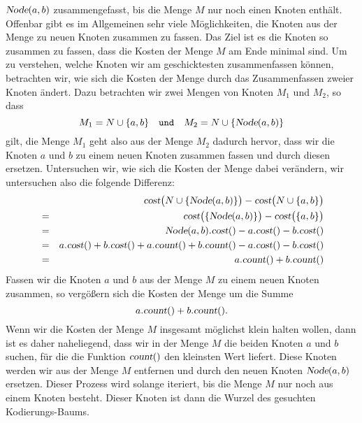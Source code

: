 $\textsl{Node}(a,b)$ zusammengefasst, bis die Menge $M$ nur noch einen Knoten enth\"alt.
Offenbar gibt es im Allgemeinen sehr viele M\"oglichkeiten, die Knoten aus der Menge zu
neuen Knoten zusammen zu fassen.  Das Ziel ist es die Knoten so zusammen zu fassen, dass
die Kosten der Menge $M$ am Ende  minimal sind.
Um zu verstehen, welche Knoten wir am geschicktesten zusammenfassen k\"onnen, betrachten wir, wie
sich die Kosten der Menge durch das Zusammenfassen zweier Knoten \"andert.
Dazu betrachten wir zwei Mengen von Knoten $M_1$ und $M_2$, so dass 
\[ M_1 = N \cup \{ a, b\} \quad \mathtt{und} \quad M_2 = N \cup \{ \textsl{Node}(a,b) \} \]
gilt, die Menge $M_1$ geht also aus der Menge $M_2$ dadurch hervor, dass wir
die Knoten $a$ und $b$ zu einem neuen Knoten zusammen fassen und durch diesen ersetzen.
Untersuchen wir, wie
sich die Kosten der Menge dabei ver\"andern, wir untersuchen also die folgende Differenz:
\begin{eqnarray*}
& & \textsl{cost}\bigl(N \cup \{ \textsl{Node}(a,b) \}\bigr) - \textsl{cost}\bigl(N \cup \{ a,b \}\bigr) \\
&=& \textsl{cost}\bigl( \{ \textsl{Node}(a,b) \}\bigr) - \textsl{cost}\bigl(\{ a,b \}\bigr)              \\
&=& \textsl{Node}(a,b).\textsl{cost}() - a.\textsl{cost}() - b.\textsl{cost}()                           \\
&=&   a.\textsl{cost}() + b.\textsl{cost}() + a.\textsl{count}() + b.\textsl{count}() 
    - a.\textsl{cost}() - b.\textsl{cost}()                                                              \\
&=& a.\textsl{count}() + b.\textsl{count}() 
\end{eqnarray*}
Fassen wir die Knoten $a$ und $b$ aus der Menge $M$ zu einem neuen Knoten zusammen, so verg\"o{\ss}ern sich
die Kosten der Menge um die Summe
\[ a.\textsl{count}() + b.\textsl{count}(). \]
Wenn wir die Kosten der Menge $M$ insgesamt m\"oglichst klein halten wollen, dann ist es daher naheliegend,
dass wir in der Menge $M$ die beiden Knoten $a$ und $b$ suchen, f\"ur die die Funktion
$\textsl{count}()$ den kleinsten Wert liefert.  Diese Knoten werden wir aus der Menge $M$
entfernen und durch den neuen Knoten $\textsl{Node}(a,b)$ ersetzen.
Dieser Prozess wird solange iteriert, bis die Menge $M$ nur noch aus einem Knoten besteht.  Dieser
Knoten ist dann die Wurzel des gesuchten Kodierungs-Baums. 

